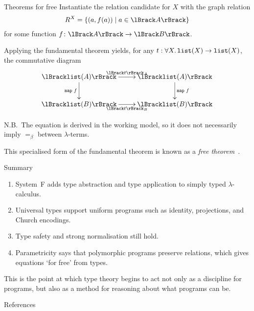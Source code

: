 \begin{frame}{Theorems for free}
  Instantiate the relation candidate for $X$ with the graph relation
  \[
    R^X = \{(a,f(a)) \mid a \in \Brackets{A}\}
  \]
  for some function $f\colon \Brackets{A} \to \Brackets{B}$.

  Applying the fundamental theorem yields, for any
  $t : \forall X.\,\mathtt{list}(X) \to \mathtt{list}(X)$, the commutative diagram
  \[
    \xymatrix{
      \Brackets{\List(A)} \ar[r]^{\Brackets{t}_A} \ar[d]_{\mathtt{map}\;f}
        & \Brackets{\List(A)} \ar[d]^{\mathtt{map}\;f} \\
      \Brackets{\List(B)} \ar[r]_{\Brackets{t}_B}
        & \Brackets{\List(B)}
    }
  \]

  N.B.\ The equation is derived in the working model, so it does not necessarily
  imply $=_{\beta}$ between $\lambda$-terms.

  This specialised form of the fundamental theorem is known as a
  \emph{free theorem}~\cite{Wadler1989}.
\end{frame}

\begin{frame}{Summary}
  \begin{enumerate}
    \item System~F adds type abstraction and type application to simply typed
      $\lambda$-calculus.
    \item Universal types support uniform programs such as identity, projections,
      and Church encodings.
    \item Type safety and strong normalisation still hold.
    \item Parametricity says that polymorphic programs preserve relations, which
      gives equations `for free' from types.
  \end{enumerate}

  \vfill

  This is the point at which type theory begins to act not only as a discipline
  for programs, but also as a method for reasoning about what programs can be.
\end{frame}

\begin{frame}[allowframebreaks]{References}
  
  
\end{frame}


